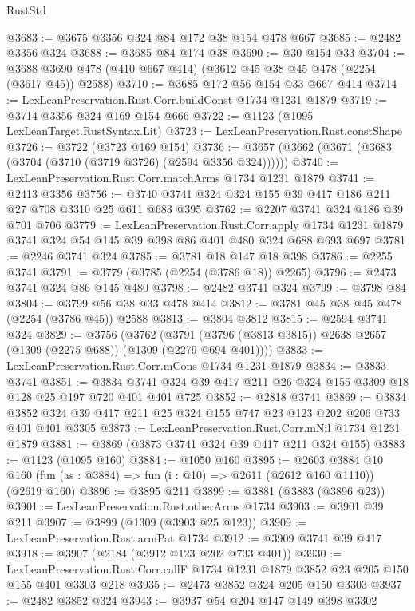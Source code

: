 \begin{lexlean}{RustStd}
\begin{coremodule}
@3683 := @3675 @3356 @324 @84 @172 @38 @154 @478 @667
@3685 := @2482 @3356 @324
@3688 := @3685 @84 @174 @38
@3690 := @30 @154 @33
@3704 := @3688 @3690 @478 (@410 @667 @414) (@3612 @45 @38 @45 @478 (@2254 (@3617 @45)) @2588)
@3710 := @3685 @172 @56 @154 @33 @667 @414
@3714 := LexLeanPreservation.Rust.Corr.buildConst @1734 @1231 @1879
@3719 := @3714 @3356 @324 @169 @154 @666
@3722 := @1123 (@1095 LexLeanTarget.RustSyntax.Lit)
@3723 := LexLeanPreservation.Rust.constShape
@3726 := @3722 (@3723 @169 @154)
@3736 := @3657 (@3662 (@3671 (@3683 (@3704 (@3710 (@3719 @3726) (@2594 @3356 @324))))))
@3740 := LexLeanPreservation.Rust.Corr.matchArms @1734 @1231 @1879
@3741 := @2413 @3356
@3756 := @3740 @3741 @324 @324 @155 @39 @417 @186 @211 @27 @708 @3310 @25 @611 @683 @395
@3762 := @2207 @3741 @324 @186 @39 @701 @706
@3779 := LexLeanPreservation.Rust.Corr.apply
    @1734
    @1231
    @1879
    @3741
    @324
    @54
    @145
    @39
    @398
    @86
    @401
    @480
    @324
    @688
    @693
    @697
@3781 := @2246 @3741 @324
@3785 := @3781 @18 @147 @18 @398
@3786 := @2255 @3741
@3791 := @3779 (@3785 (@2254 (@3786 @18)) @2265)
@3796 := @2473 @3741 @324 @86 @145 @480
@3798 := @2482 @3741 @324
@3799 := @3798 @84
@3804 := @3799 @56 @38 @33 @478 @414
@3812 := @3781 @45 @38 @45 @478 (@2254 (@3786 @45)) @2588
@3813 := @3804 @3812
@3815 := @2594 @3741 @324
@3829 := @3756
    (@3762 (@3791 (@3796 (@3813 @3815)) @2638 @2657 (@1309 (@2275 @688)) (@1309 (@2279 @694 @401))))
@3833 := LexLeanPreservation.Rust.Corr.mCons @1734 @1231 @1879
@3834 := @3833 @3741
@3851 := @3834 @3741 @324 @39 @417 @211 @26 @324 @155 @3309 @18 @128 @25 @197 @720 @401 @401 @725
@3852 := @2818 @3741
@3869 := @3834 @3852 @324 @39 @417 @211 @25 @324 @155 @747 @23 @123 @202 @206 @733 @401 @401 @3305
@3873 := LexLeanPreservation.Rust.Corr.mNil @1734 @1231 @1879
@3881 := @3869 (@3873 @3741 @324 @39 @417 @211 @324 @155)
@3883 := @1123 (@1095 @160)
@3884 := @1050 @160
@3895 := @2603
    @3884
    @10
    @160
    (fun (as : @3884) => fun (i : @10) => @2611 (@2612 @160 @1110))
    (@2619 @160)
@3896 := @3895 @211
@3899 := @3881 (@3883 (@3896 @23))
@3901 := LexLeanPreservation.Rust.otherArms @1734
@3903 := @3901 @39 @211
@3907 := @3899 (@1309 (@3903 @25 @123))
@3909 := LexLeanPreservation.Rust.armPat @1734
@3912 := @3909 @3741 @39 @417
@3918 := @3907 (@2184 (@3912 @123 @202 @733 @401))
@3930 := LexLeanPreservation.Rust.Corr.callF
    @1734
    @1231
    @1879
    @3852
    @23
    @205
    @150
    @155
    @401
    @3303
    @218
@3935 := @2473 @3852 @324 @205 @150 @3303
@3937 := @2482 @3852 @324
@3943 := @3937 @54 @204 @147 @149 @398 @3302

\end{coremodule}
\end{lexlean}
